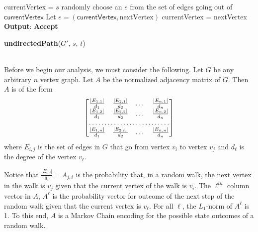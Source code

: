 \documentclass[psamsfonts, 10pt]{amsart}
\theoremstyle{definition}
\theoremstyle{remark}
\numberwithin{equation}{section}
\newcommand{\creturn}{\mbox{}\\}
\begin{document}
\begin{algorithm}[H]
\textsf{currentVertex} = $s$\;
 {
	randomly choose an $e$ from the set of edges going out of $\textsf{currentVertex}$\;
	Let $e = (\textsf{currentVertex}, \text{nextVertex})$\;
	\textsf{currentVertex} = \textsf{nextVertex}\;
}
 {
{\bf Output}: {\bf Accept}\;
}

\caption{{\bf undirectedPath}($G'$, $s$, $t$)}
\end{algorithm}
\creturn
Before we begin our analysis, we must consider the following. Let $G$ be any arbitrary $n$ vertex graph. Let $A$ be the normalized adjacency matrix of $G$. Then $A$ is of the form
\[
\begin{bmatrix}
    \frac{\lvert E_{1,1}\rvert}{d_1}     &  \frac{\lvert E_{2,1}\rvert}{d_2} & \dots &  \frac{\lvert E_{n,1}\rvert}{d_n} \\
   \frac{\lvert E_{1,2}\rvert}{d_1}       &  \frac{\lvert E_{2,2}\rvert}{d_2}  & \dots &  \frac{\lvert E_{n,2}\rvert}{d_n}  \\
    \hdotsfor{4} \\
     \frac{\lvert E_{1,n}\rvert}{d_1}       & \frac{\lvert E_{2,n}\rvert}{d_2} & \dots &  \frac{\lvert E_{n,n}\rvert}{d_n} 
\end{bmatrix}
\]
where $E_{i,j}$ is the set of edges in $G$ that go from vertex $v_i$ to vertex $v_j$ and $d_\ell$ is the degree of the vertex $v_\ell$.

Notice that $\frac{\lvert E_{i,j}\rvert}{d_i} = A_{j,i}$ is the probability that, in a random walk, the next vertex in the walk is $v_j$ given that the current vertex of the walk is $v_i$. The $\ell^{th}$ column vector in $A$, $A^{\ell}$ is the probability vector for outcome of the next step of the random walk given that the current vertex is $v_{\ell}$. For all $\ell$,  the $L_1$-norm of $A^{\ell}$ is 1. To this end, $A$ is a Markov Chain encoding for the possible state outcomes of a random walk.\\
\end{document}
